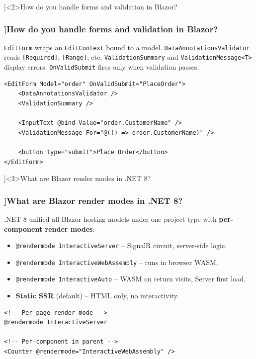 \QuestionSlide[\CategoryBadge[BlazorColor!20]{Blazor Server}]<2>{How do you handle forms and validation in Blazor?}

\begin{frame}[fragile]
  \frametitle{\AnswerTitle[\CategoryBadge[BlazorColor!20]{Blazor Server}]{How do you handle forms and validation in Blazor?}}

  {\footnotesize
  \texttt{EditForm} wraps an \texttt{EditContext} bound to a model. \texttt{DataAnnotationsValidator} reads \texttt{[Required]}, \texttt{[Range]}, etc. \texttt{ValidationSummary} and \texttt{ValidationMessage<T>} display errors. \texttt{OnValidSubmit} fires only when validation passes.
  }

  \begin{verbatim}
<EditForm Model="order" OnValidSubmit="PlaceOrder">
    <DataAnnotationsValidator />
    <ValidationSummary />

    <InputText @bind-Value="order.CustomerName" />
    <ValidationMessage For="@(() => order.CustomerName)" />

    <button type="submit">Place Order</button>
</EditForm>
  \end{verbatim}
\end{frame}

\QuestionSlide[\CategoryBadge[BlazorColor!20]{Blazor Server}]<3>{What are Blazor render modes in .NET 8?}

\begin{frame}[fragile]
  \frametitle{\AnswerTitle[\CategoryBadge[BlazorColor!20]{Blazor Server}]{What are Blazor render modes in .NET 8?}}

  {\footnotesize
  .NET 8 unified all Blazor hosting models under one project type with \textbf{per-component render modes}:
  \begin{itemize}
    \item \texttt{@rendermode InteractiveServer} – SignalR circuit, server-side logic.
    \item \texttt{@rendermode InteractiveWebAssembly} – runs in browser WASM.
    \item \texttt{@rendermode InteractiveAuto} – WASM on return visits, Server first load.
    \item \textbf{Static SSR} (default) – HTML only, no interactivity.
  \end{itemize}
  }

  \begin{verbatim}
<!-- Per-page render mode -->
@rendermode InteractiveServer

<!-- Per-component in parent -->
<Counter @rendermode="InteractiveWebAssembly" />
  \end{verbatim}
\end{frame}
